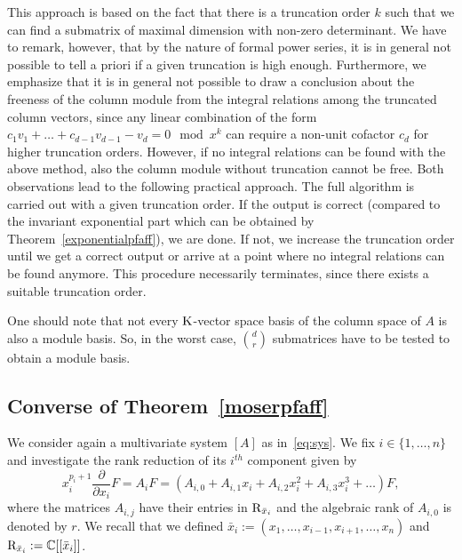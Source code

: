 \documentclass[final,1p,times,number,amsthm]{elsart}
\newcommand{\pder}[2]{\frac{\partial}{\partial #2}#1}
\begin{document}
This approach is based on the fact that there is a truncation order $k$ such
that we can find a submatrix of maximal dimension with non-zero determinant. We
have to remark, however, that by the nature of formal power series, it is in
general not possible to tell a priori if a given truncation is high
enough.  Furthermore, we emphasize that it is in general not
  possible to draw a conclusion about the freeness of the column module from the
  integral relations among the truncated column vectors, since any linear
  combination of the form $c_1v_1+\dots+c_{d-1}v_{d-1}-v_d=0 \mod x^k$ can
  require a non-unit cofactor $c_d$ for higher truncation orders. However, if no
  integral relations can be found with the above method, also the column module
  without truncation cannot be free. Both observations lead to the following
  practical approach. The full algorithm is carried out with a given truncation
  order. If the output is correct (compared to the invariant exponential part which can be obtained by Theorem~\ref{exponentialpfaff}), we are done. If not, we increase the
  truncation order until we get a correct output or arrive at a point where no
  integral relations can be found anymore.  This procedure necessarily
terminates, since there exists a suitable truncation order.  

One should note
that not every $\rm K$-vector space basis of the column space of $A$ is also a
module basis. So, in the worst case, $\binom{d}{r}$ submatrices have to be
tested to obtain a module basis.





\subsection{Converse of Theorem~\ref{moserpfaff}}

\label{proofpfaff}
We consider again a multivariate system $[A]$ as in~\eqref{eq:sys}. We fix
$i \in \{ 1, \dots, n \}$ and investigate the rank reduction of its ${i}^{th}$
component given by
\begin{equation}
\label{first}
x_{i}^{p_{i}+1} \pder{F}{x_i} = A_{i}F = (A_{i,0} + A_{i,1} x_{i} + A_{i,2}
x^2_{i} + A_{i,3} x^3_{i} + \dots )F ,
\end{equation}
where the matrices $A_{i,j}$ have their entries in ${\rm R}_{\bar{x}_i}$ and the
algebraic rank of $A_{i,0}$ is denoted by $r$. We recall that we defined
$\bar{x}_{i}:= (x_1, \dots, x_{i-1},x_{i+1}, \dots, x_n)$ and ${\rm R}_{\bar{x}_i}
:= \mathbb{C}[[\bar{x}_{i} ]]$.
\end{document}
